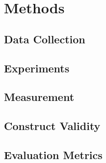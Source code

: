 
\section{Methods}

\subsection{Data Collection}
\lipsum[30-33]

\subsection{Experiments}
\lipsum[12-14]

\subsection{Measurement}
\lipsum[14-15]

\subsection{Construct Validity}
\lipsum[14-15]

\subsection{Evaluation Metrics}
\lipsum[37-39]




